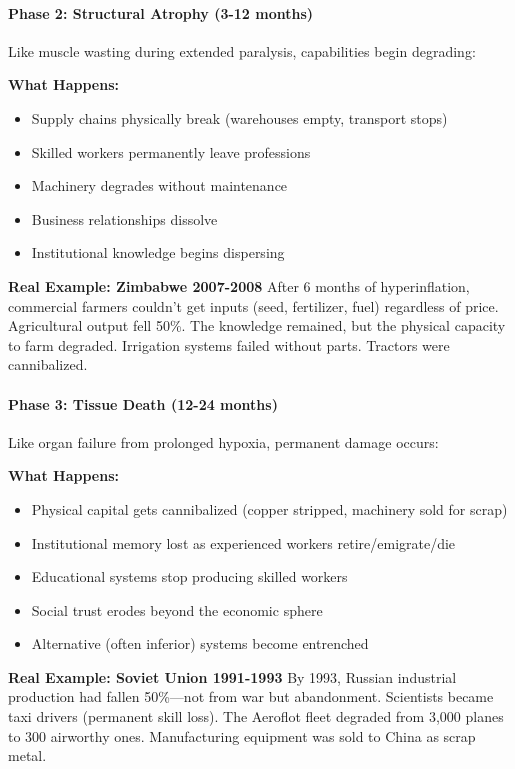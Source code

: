 \documentclass[11pt,oneside]{book}
\begin{document}
\paragraph{Phase 2: Structural Atrophy (3-12 months)}
Like muscle wasting during extended paralysis, capabilities begin degrading:

\textbf{What Happens:}
\begin{itemize}
\item Supply chains physically break (warehouses empty, transport stops)
\item Skilled workers permanently leave professions
\item Machinery degrades without maintenance
\item Business relationships dissolve
\item Institutional knowledge begins dispersing
\end{itemize}

\textbf{Real Example: Zimbabwe 2007-2008}
After 6 months of hyperinflation, commercial farmers couldn't get inputs (seed, fertilizer, fuel) regardless of price. Agricultural output fell 50\%. The knowledge remained, but the physical capacity to farm degraded. Irrigation systems failed without parts. Tractors were cannibalized.

\paragraph{Phase 3: Tissue Death (12-24 months)}
Like organ failure from prolonged hypoxia, permanent damage occurs:

\textbf{What Happens:}
\begin{itemize}
\item Physical capital gets cannibalized (copper stripped, machinery sold for scrap)
\item Institutional memory lost as experienced workers retire/emigrate/die
\item Educational systems stop producing skilled workers
\item Social trust erodes beyond the economic sphere
\item Alternative (often inferior) systems become entrenched
\end{itemize}

\textbf{Real Example: Soviet Union 1991-1993}
By 1993, Russian industrial production had fallen 50\%—not from war but abandonment. Scientists became taxi drivers (permanent skill loss). The Aeroflot fleet degraded from 3,000 planes to 300 airworthy ones. Manufacturing equipment was sold to China as scrap metal.
\end{document}
